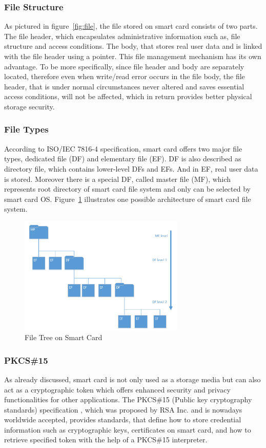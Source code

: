 \subsubsection{File Structure}
As pictured in figure~\ref{fig:file}, the file stored on smart card consists of two parts.  The file header, which encapsulates administrative information such as, file structure and access conditions. The body, that stores real user data and is linked with the file header using a pointer. This file management mechanism has its own advantage. To be more specifically, since file header and body are separately located, therefore even when write/read error occurs in the file body, the file header, that is under normal circumstances never altered and saves essential access conditions, will not be affected, which in return provides better physical storage security.

\subsubsection{File Types}
According to ISO/IEC 7816-4 specification, smart card offers two major file types, dedicated file (DF) and elementary file (EF). DF is also described as directory file, which contains lower-level DFs and EFs. And in EF, real user data is stored. Moreover there is a special DF, called master file (MF), which represents root directory of smart card file system and only can be selected by smart card OS. Figure~\ref{fig:file-structure} illustrates one possible architecture of smart card file system.

\begin{figure}[!htbp]
	\centering
	\includegraphics[width=0.7\textwidth]{file-structure}
		\caption{File Tree on Smart Card \cite{handbuch}}
	\label{fig:file-structure}
\end{figure}

\subsubsection{PKCS{\#}15}
As already discussed, smart card is not only used as a storage media but can also act as a cryptographic token which offers enhanced security and privacy functionalities for other applications. The PKCS\#15 (Public key cryptography standards) specification \cite{pkcs}, which was proposed by RSA Inc. and is nowadays worldwide accepted, provides standards, that define how to store credential information such as cryptographic keys, certificates on smart card, and how to retrieve specified token with the help of a PKCS\#15 interpreter.
 
